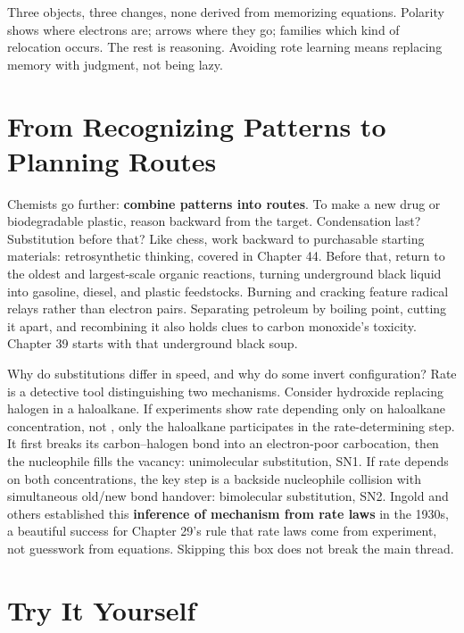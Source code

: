 Three objects, three changes, none derived from memorizing equations. Polarity shows where electrons are; arrows where they go; families which kind of relocation occurs. The rest is reasoning. Avoiding rote learning means replacing memory with judgment, not being lazy.

\section{From Recognizing Patterns to Planning Routes}

Chemists go further: \textbf{combine patterns into routes}. To make a new drug or biodegradable plastic, reason backward from the target. Condensation last? Substitution before that? Like chess, work backward to purchasable starting materials: retrosynthetic thinking, covered in Chapter 44. Before that, return to the oldest and largest-scale organic reactions, turning underground black liquid into gasoline, diesel, and plastic feedstocks. Burning and cracking feature radical relays rather than electron pairs. Separating petroleum by boiling point, cutting it apart, and recombining it also holds clues to carbon monoxide's toxicity. Chapter 39 starts with that underground black soup.

\begin{tiaozhan}
Why do substitutions differ in speed, and why do some invert configuration? Rate is a detective tool distinguishing two mechanisms. Consider hydroxide replacing halogen in a haloalkane. If experiments show rate depending only on haloalkane concentration, not , only the haloalkane participates in the rate-determining step. It first breaks its carbon--halogen bond into an electron-poor carbocation, then the nucleophile fills the vacancy: unimolecular substitution, SN1. If rate depends on both concentrations, the key step is a backside nucleophile collision with simultaneous old/new bond handover: bimolecular substitution, SN2. Ingold and others established this \textbf{inference of mechanism from rate laws} in the 1930s, a beautiful success for Chapter 29's rule that rate laws come from experiment, not guesswork from equations. Skipping this box does not break the main thread.
\end{tiaozhan}

\section*{Try It Yourself}

